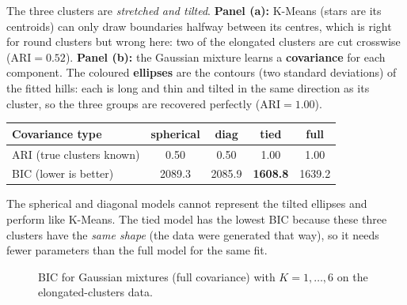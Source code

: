 \begin{explain}
The three clusters are \emph{stretched and tilted}. \textbf{Panel (a):} K-Means (stars are its centroids) can only draw boundaries halfway between its centres, which is right for round clusters but wrong here: two of the elongated clusters are cut crosswise ($\text{ARI}=0.52$). \textbf{Panel (b):} the Gaussian mixture learns a \textbf{covariance} for each component. The coloured \textbf{ellipses} are the contours (two standard deviations) of the fitted hills: each is long and thin and tilted in the same direction as its cluster, so the three groups are recovered perfectly ($\text{ARI}=1.00$).
\end{explain}

\begin{center}
\begin{tabular}{@{}lcccc@{}}
\toprule
\textbf{Covariance type} & spherical & diag & \textbf{tied} & \textbf{full}\\
\midrule
ARI (true clusters known) & 0.50 & 0.50 & 1.00 & 1.00\\
BIC (lower is better) & 2089.3 & 2085.9 & \textbf{1608.8} & 1639.2\\
\bottomrule
\end{tabular}
\end{center}

\noindent The spherical and diagonal models cannot represent the tilted ellipses and perform like K-Means. The tied model has the lowest BIC because these three clusters have the \emph{same shape} (the data were generated that way), so it needs fewer parameters than the full model for the same fit.

\begin{figure}[!htbp]
\centering
{}
\caption{BIC for Gaussian mixtures (full covariance) with $K=1,\dots,6$ on the elongated-clusters data.}\label{fig:bic}
\end{figure}

